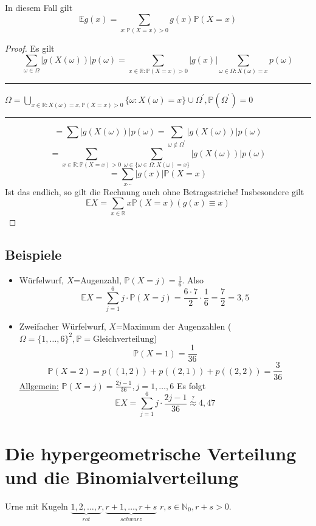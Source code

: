\documentclass[a4paper,11pt,notitlepage]{report}
\newcommand{\R}{{\ensuremath{\mathbb{R}}}}
\newcommand{\N}{{\ensuremath{\mathbb{N}}}}
\newcommand{\Prim}{{\ensuremath{\mathbb{P}}}}
\newcommand{\E}{{\ensuremath{\mathbb{E}}}}
\begin{document}
In diesem Fall gilt
$$\E g(x) = \sum\limits_{x \colon \Prim(X=x)>0}{g(x) \Prim(X=x)}$$

\begin{proof}
	Es gilt
	$$\sum\limits_{\omega \in \Omega}{|g\left(X(\omega)\right)|p(\omega)} = \sum\limits_{x \in \R \colon \Prim(X=x)>0}{|g(x)|} \sum\limits_{\omega \in \Omega \colon X(\omega) = x}{p(\omega)}$$
	\hrule
	$\Omega = \bigcup\limits_{x \in \R \colon X(\omega) = x, \Prim(X=x)>0}{\{\omega \colon X(\omega) = x\}} \cup \Omega^\prime, \Prim(\Omega^\prime) = 0$
	\hrule
	$$= \sum{|g\left(X(\omega)\right)|p(\omega)} = \sum\limits_{\omega \notin \Omega^\prime}{|g\left(X(\omega)\right)|p(\omega)}$$
	$$= \sum\limits_{x \in \R \colon \Prim(X=x)>0}{\sum\limits_{\omega \in \{\omega \in \Omega \colon X(\omega) = x \}}{|g(X(\omega))|p(\omega)}}$$
	$$= \sum\limits_{x \cdots}{|g(x)| \Prim(X=x)}$$
	Ist das endlich, so gilt die Rechnung auch ohne Betragsstriche!
	\newline
	Insbesondere gilt
	$$\E X = \sum\limits_{x \in \R}{x \Prim(X=x)} \left(g(x)\equiv x\right)$$
\end{proof}

\section{Beispiele}
\begin{itemize}
	\item Würfelwurf, $X$=Augenzahl, $\Prim(X=j)=\frac{1}{6}$.
		\newline Also $$\E X = \sum\limits_{j=1}^{6}{j \cdot \Prim(X=j)}=\frac{6\cdot 7}{2} \cdot \frac{1}{6} = \frac{7}{2} = 3,5$$
	\item Zweifacher Würfelwurf, $X$=Maximum der Augenzahlen ($\Omega=\{1,\ldots,6\}^2, \Prim = \text{Gleichverteilung}$)
		 $$\Prim(X=1)=\frac{1}{36}$$
		 $$\Prim(X=2)=p((1,2)) + p((2,1)) + p((2,2)) = \frac{3}{36}$$
		 \underline{Allgemein:} $\Prim(X=j)=\frac{2j-1}{36}, j =1,\ldots,6$
		 \newline
		 Es folgt
		 $$\E X = \sum\limits_{j=1}^{6}{j \cdot \frac{2j-1}{36}} \overset{?}{\approx} 4,47$$
\end{itemize}

\chapter{Die hypergeometrische Verteilung und die Binomialverteilung}
Urne mit Kugeln $\underbrace{1,2,\ldots,r}_{rot}, \underbrace{r+1,\ldots,r+s}_{schwarz}$
\newline $r,s \in \N_0, r+s > 0$.
\end{document}
